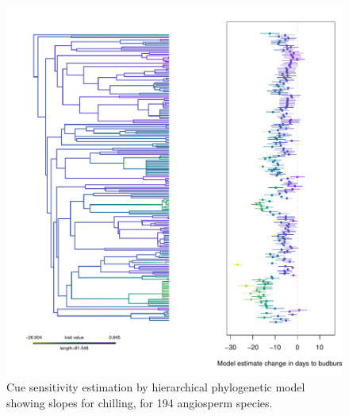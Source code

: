 \documentclass{article}\usepackage[]{graphicx}\usepackage[]{color}
\begin{document}
\begin{figure} [H]
  \begin{center}
  \includegraphics[width=14cm]{..//..//analyses/phylogeny/figures/muplot_phylo_chill.pdf}
  \caption{Cue sensitivity estimation by hierarchical phylogenetic model showing slopes for chilling, for 194 angiosperm species.}
  \label{fig:muplot_chill}
  \end{center}
\end{figure}
\end{document}
